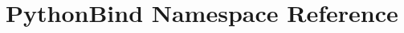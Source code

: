 \hypertarget{namespace_python_bind}{}\section{Python\+Bind Namespace Reference}
\label{namespace_python_bind}
